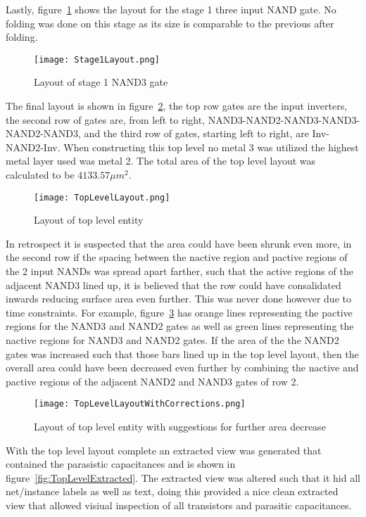 \documentclass[conference]{IEEEtran}
\begin{document}
Lastly, figure~\ref{fig:Stage1Layout} shows the layout for the stage 1 three input NAND gate. No folding was done on this stage as its size is comparable to the previous after folding.  

\begin{figure}[H]
  \center
    \texttt{[image: Stage1Layout.png]}
    \caption{Layout of stage 1 NAND3 gate}
    \label{fig:Stage1Layout}
  \end{figure} 

The final layout is shown in figure~\ref{fig:TopLevelLayout}, the top row gates are the input inverters, the second row of gates are, from left to right, NAND3-NAND2-NAND3-NAND3-NAND2-NAND3, and the third row of gates, starting left to right, are Inv-NAND2-Inv. When constructing this top level no metal 3 was utilized the highest metal layer used was metal 2. The total area of the top level layout was calculated to be $4133.57\mu m^2$.

\begin{figure}[H]
  \center
    \texttt{[image: TopLevelLayout.png]}
    \caption{Layout of top level entity}
    \label{fig:TopLevelLayout}
  \end{figure} 

   In retrospect it is suspected that the area could have been shrunk even more, in the second row if the spacing between the nactive region and pactive regions of the 2 input NANDs was spread apart farther, such that the active regions of the adjacent NAND3 lined up, it is believed that the row could have consalidated inwards reducing surface area even further. This was never done however due to time constraints. For example, figure~\ref{fig:TopLevelLayoutWithCorrections} has orange lines representing the pactive regions for the NAND3 and NAND2 gates as well as green lines representing the nactive regions for NAND3 and NAND2 gates. If the area of the the NAND2 gates was increased such that those bars lined up in the top level layout, then the overall area could have been decreased even further by combining the nactive and pactive regions of the adjacent NAND2 and NAND3 gates of row 2. 

\begin{figure}[H]
  \center
    \texttt{[image: TopLevelLayoutWithCorrections.png]}
    \caption{Layout of top level entity with suggestions for further area decrease}
    \label{fig:TopLevelLayoutWithCorrections}
  \end{figure} 


  With the top level layout complete an extracted view was generated that contained the parasistic capacitances and is shown in figure~\ref{fig:TopLevelExtracted}. The extracted view was altered such that it hid all net/instance labels as well as text, doing this provided a nice clean extracted view that allowed visiual inspection of all transistors and parasitic capacitances. 
\end{document}
